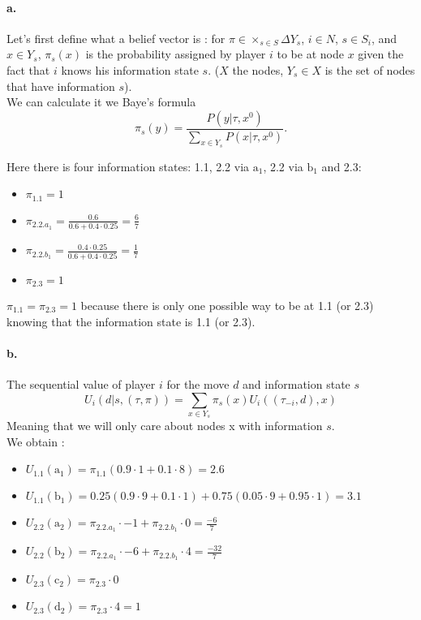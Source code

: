 \paragraph{a.} Let's first define what a belief vector is : for $\pi \in  \times_{s \in S} \Delta Y_s $, $i \in N$, $s \in S_i$, and $x \in Y_s$, $\pi_s(x)$ is the probability assigned by player $i$ to be at node $x$ given the fact that $i$ knows his information state $s$. ($X$ the nodes, $Y_s\in X$ is the set of nodes that have information $s$). \\
We can calculate it we Baye's formula $$ \pi_s(y) = \frac{P(y | \tau, x^0)}{\sum_{x \in Y_s} P(x | \tau, x^0)}. $$

Here there is four information states: 1.1, 2.2 via $\text{a}_1$, 2.2 via $\text{b}_1$ and 2.3: 

\begin{itemize}
\item $\pi_{1.1}= 1$ 
\item $\pi_{2.2.a_1} = \frac{0.6}{0.6+0.4 \cdot 0.25} = \frac{6}{7}$
\item $\pi_{2.2.b_1} = \frac{0.4\cdot 0.25}{0.6+0.4 \cdot 0.25} = \frac{1}{7}$ 
\item $\pi_{2.3}     = 1 $
\end{itemize}
$\pi_{1.1}=\pi_{2.3} = 1$ because there is only one possible way to be at 1.1 (or 2.3) knowing that the information state is 1.1 (or 2.3).

\paragraph{b.} The sequential value of player $i$ for the move $d$ and information state $s$ $$ U_i(d| s, (\tau, \pi) ) = \sum_{x \in Y_s} \pi_s(x) U_i((\tau_{-i}, d), x)$$
Meaning that we will only care about nodes x with information $s$. \\
We obtain : 
\begin{itemize}
\item $U_{1.1} (\text{a}_1) = \pi_{1.1} (0.9 \cdot 1 + 0.1 \cdot 8) = 2.6$
\item $U_{1.1} (\text{b}_1) = 0.25 (0.9 \cdot 9 + 0.1 \cdot 1) + 0.75 (0.05 \cdot 9 + 0.95 \cdot 1) = 3.1$
\item $U_{2.2} (\text{a}_2) = \pi_{2.2.a_1} \cdot -1 + \pi_{2.2.b_1} \cdot 0 = \frac{-6}{7}$
\item $U_{2.2} (\text{b}_2) = \pi_{2.2.a_1} \cdot -6 + \pi_{2.2.b_1} \cdot 4 = \frac{-32}{7}$
\item $U_{2.3} (\text{c}_2) = \pi_{2.3} \cdot 0 $
\item $U_{2.3} (\text{d}_2) = \pi_{2.3} \cdot 4 = 1$
\end{itemize}

